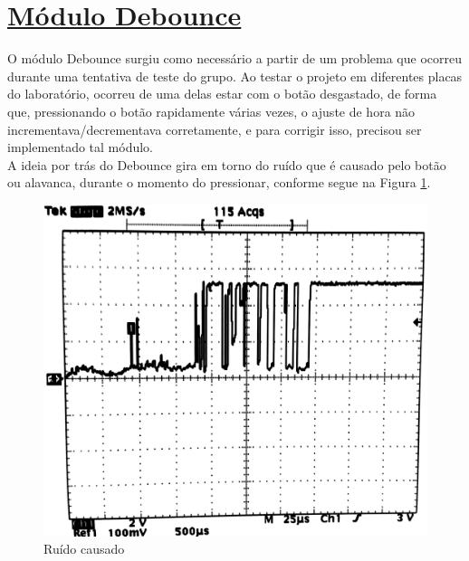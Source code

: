 \documentclass[14pt, oneside]{book}
\newcommand\tab[1][1cm]{\hspace*{#1}}
\theoremstyle{definition}
\begin{document}
               
                
            \section[Módulo Debounce]{\hyperlink{toc}{Módulo Debounce}}
                \tab O módulo Debounce surgiu como necessário a partir de um problema que ocorreu durante uma tentativa de teste do grupo. Ao testar o projeto em diferentes placas do laboratório, ocorreu de uma delas estar com o botão desgastado, de forma que, pressionando o botão rapidamente várias vezes, o ajuste de hora não incrementava/decrementava corretamente, e para corrigir isso, precisou ser implementado tal módulo. \\
                \tab A ideia por trás do Debounce gira em torno do ruído que é causado pelo botão ou alavanca, durante o momento do pressionar, conforme segue na Figura \ref{fig:debounce2}. \\
                \begin{figure}[H]
                    \centering
                    \includegraphics[scale=0.2]{debouncezao.png}
                    \caption{Ruído causado}
                    \label{fig:debounce2}
                \end{figure} \\
                
\end{document}
